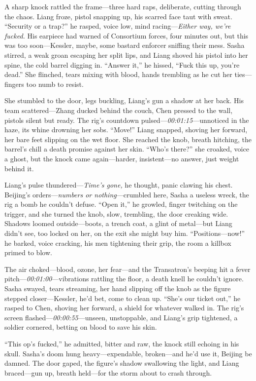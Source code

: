 \documentclass[12pt]{book}
\begin{document}
A sharp knock rattled the frame—three hard raps, deliberate, cutting through the chaos. Liang froze, pistol snapping up, his scarred face taut with sweat. “Security or a trap?” he rasped, voice low, mind racing—\textit{Either way, we’re fucked.} His earpiece had warned of Consortium forces, four minutes out, but this was too soon—Kessler, maybe, some bastard enforcer sniffing their mess. Sasha stirred, a weak groan escaping her split lips, and Liang shoved his pistol into her spine, the cold barrel digging in. “Answer it,” he hissed, “Fuck this up, you’re dead.” She flinched, tears mixing with blood, hands trembling as he cut her ties—fingers too numb to resist.

She stumbled to the door, legs buckling, Liang’s gun a shadow at her back. His team scattered—Zhang ducked behind the couch, Chen pressed to the wall, pistols silent but ready. The rig’s countdown pulsed—\textit{00:01:15}—unnoticed in the haze, its whine drowning her sobs. “Move!” Liang snapped, shoving her forward, her bare feet slipping on the wet floor. She reached the knob, breath hitching, the barrel’s chill a death promise against her skin. “Who’s there?” she croaked, voice a ghost, but the knock came again—harder, insistent—no answer, just weight behind it.

Liang’s pulse thundered—\textit{Time’s gone,} he thought, panic clawing his chest. Beijing’s orders—\textit{numbers or nothing}—crumbled here, Sasha a useless wreck, the rig a bomb he couldn’t defuse. “Open it,” he growled, finger twitching on the trigger, and she turned the knob, slow, trembling, the door creaking wide. Shadows loomed outside—boots, a trench coat, a glint of metal—but Liang didn’t see, too locked on her, on the exit she might buy him. “Positions—now!” he barked, voice cracking, his men tightening their grip, the room a killbox primed to blow.

The air choked—blood, ozone, her fear—and the Transatron’s beeping hit a fever pitch—\textit{00:01:00}—vibrations rattling the floor, a death knell he couldn’t ignore. Sasha swayed, tears streaming, her hand slipping off the knob as the figure stepped closer—Kessler, he’d bet, come to clean up. “She’s our ticket out,” he rasped to Chen, shoving her forward, a shield for whatever walked in. The rig’s screen flashed—\textit{00:00:55}—unseen, unstoppable, and Liang’s grip tightened, a soldier cornered, betting on blood to save his skin.

“This op’s fucked,” he admitted, bitter and raw, the knock still echoing in his skull. Sasha’s doom hung heavy—expendable, broken—and he’d use it, Beijing be damned. The door gaped, the figure’s shadow swallowing the light, and Liang braced—gun up, breath held—for the storm about to crash through.
\end{document}
